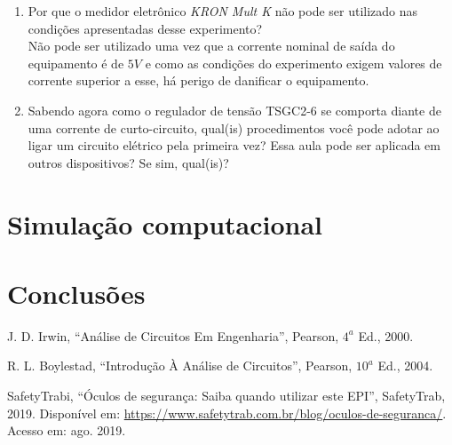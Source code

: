 \documentclass[a4paper,12pt,oneside,openany,table,xcdraw]{article}
\begin{document}
\begin{enumerate}[1)]
\item Por que o medidor eletrônico \emph{KRON Mult K} não pode ser utilizado nas condições apresentadas desse experimento?\\
Não pode ser utilizado uma vez que a corrente nominal de saída do equipamento é de $5V$ e como as condições do experimento exigem valores de corrente superior a esse, há perigo de danificar o equipamento.

\item Sabendo agora como o regulador de tensão TSGC2-6 se comporta diante de uma corrente de curto-circuito, qual(is) procedimentos você pode adotar ao ligar um circuito elétrico pela primeira vez? Essa aula pode ser aplicada em outros dispositivos? Se sim, qual(is)?\\

\end{enumerate}
\section{Simulação computacional} %

\section{Conclusões} %



\newpage
\begin{thebibliography}{9} 
    J. D. Irwin,
    “Análise de Circuitos Em Engenharia”, Pearson, $4^a$ Ed., 2000.

    R. L. Boylestad,
    “Introdução À Análise de Circuitos”, Pearson, $10^a$ Ed., 2004.

    SafetyTrabi,
    “Óculos de segurança: Saiba quando utilizar este EPI”, SafetyTrab, 2019.
 Disponível em:
 \url{https://www.safetytrab.com.br/blog/oculos-de-seguranca/}. Acesso em: ago. 2019.


\end{thebibliography}
\end{document}
